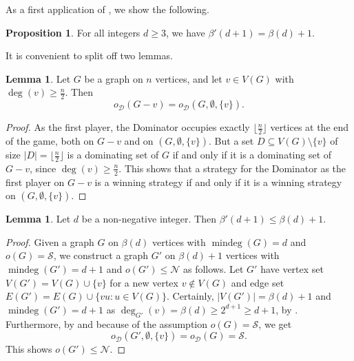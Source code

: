 \documentclass[a4paper,11pt,oneside]{scrartcl}
\theoremstyle{definition}
\newtheorem{proposition}[definition]{Proposition}
\newtheorem{lemma}[definition]{Lemma}
\theoremstyle{remark}
\DeclareMathOperator{\mindeg}{mindeg}
\begin{document}
As a first application of , we show the following.

\begin{proposition}\label{proposition:beta'(d+1)=beta(d)+1_large_d}
    For all integers $d\geq 3$, we have $\beta'(d+1)=\beta(d)+1$.
\end{proposition}

It is convenient to split off two lemmas. 
\begin{lemma}\label{lemma:delete_huge_deg_vertex_if_Staller_goes_first}
Let $G$ be a graph on $n$ vertices, and let $v \in V(G)$ with $\deg(v) \geq \frac n2$. Then 
    \[o_{\mathcal D}(G - v) = o_{\mathcal D} (G, \emptyset, \{v\}).\]
\end{lemma}
\begin{proof}
    As the first player, the Dominator occupies exactly $\lfloor \frac n2 \rfloor$ vertices at the end of the game, both on $G-v$ and on $(G, \emptyset,\{v\})$. But a set $D \subseteq V(G) \setminus \{v\}$ of size $|D| = \lfloor \frac n2 \rfloor$ is a dominating set of $G$ if and only if it is a dominating set of $G-v$, since $\deg(v) \geq \frac n2$. This shows that a strategy for the Dominator as the first player on $G-v$ is a winning strategy if and only if it is a winning strategy on $(G,\emptyset, \{v\})$. 
\end{proof}

\begin{lemma}\label{lemma:beta'(d+1)_leq_beta(d)+1}
    Let $d$ be a non-negative integer. Then $\beta'(d+1)\leq \beta(d)+1$.
\end{lemma}
\begin{proof}
    Given a graph $G$ on $\beta(d)$ vertices with $\mindeg(G) = d$ and $o(G) = \mathcal S$, we construct a graph $G'$ on $\beta(d)+1$ vertices with $\mindeg(G') = d+1$ and $o(G') \leq \mathcal N$ as follows.
    Let $G'$ have vertex set $V(G') = V(G) \cup \{v\}$ for a new vertex $v \notin V(G)$ and edge set $E(G') = E(G) \cup \{vu : u \in V(G) \}$.
    Certainly, $|V(G')|=\beta(d)+1$ and $\mindeg(G')=d+1$ as $\deg_{G'}(v) = \beta(d)\geq 2^{d+1} \geq d+1$, by . Furthermore, by  and because of the assumption $o(G) = \mathcal S$, we get
    \[
        o_{\mathcal D}(G', \emptyset, \{v\}) = o_{\mathcal D}(G) = \mathcal S.
    \]
    This shows $o(G') \leq \mathcal N$.
\end{proof}
\end{document}
